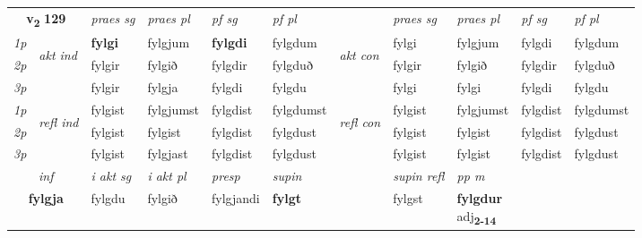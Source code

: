\noindent
\begin{tabular}{lllllllllll} \toprule
\multicolumn{2}{c}{\textbf{v{\textsubscript{2}}} \Large{\textbf{129}}}  &  \textit{praes sg}  & \textit{praes pl}  &\textit{ pf sg} & \textit{pf pl} &  &  \textit{praes sg}  & \textit{praes pl}  & \textit{pf sg} & \textit{pf pl } \\*
	\cmidrule{3-6} \cmidrule{8-11}
 {\textit{1p}} & \multirow{3}{*}{\begin{turn}{90}\textit{akt ind}\end{turn}} & \textbf{fylgi} & fylgjum & \textbf{fylgdi} & fylgdum & \multirow{3}{*}{\begin{turn}{90}\textit{akt con}\end{turn}} &fylgi & fylgjum & fylgdi & fylgdum\\*
 {\textit{2p}} &  &  fylgir  & fylgið & fylgdir & fylgduð & & fylgir & fylgið & fylgdir & fylgduð \\*
{\textit{3p}} &  & fylgir & fylgja & fylgdi & fylgdu & & fylgi & fylgi& fylgdi & fylgdu \\*
\cmidrule{3-6} \cmidrule{8-11}
 {\textit{1p}} & \multirow{3}{*}{\begin{turn}{90}\textit{refl ind}\end{turn}}  & fylgist & fylgjumst & fylgdist & fylgdumst & \multirow{3}{*}{\begin{turn}{90}\textit{refl con}\end{turn}}  &fylgist & fylgjumst & fylgdist & fylgdumst \\*
 {\textit{2p}} &  & fylgist & fylgist & fylgdist & fylgdust & &fylgist & fylgist & fylgdist & fylgdust \\*
 {\textit{3p}}  & & fylgist & fylgjast & fylgdist & fylgdust & & fylgist & fylgist& fylgdist & fylgdust \\*
\cmidrule{3-6} \cmidrule{8-11}

   \multicolumn{2}{c}{\textit{inf}}  & \textit{i akt sg} & \textit{i akt pl}   & \textit{presp} & \textit{supin} && \textit{supin refl} & \textit{pp m} \\*
  \multicolumn{2}{c}{\textbf{fylgja}} & fylgdu  & fylgið   & fylgjandi &  \textbf{fylgt} && fylgst & \specialcell{\textbf{fylgdur} \\ adj\textbf{\textsubscript{2-14}}} \\*
\end{tabular}

